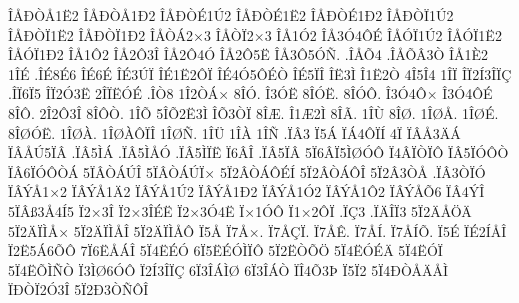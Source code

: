 {^^ce^^c5^^d0^^d2^^c51^^cb2
^^ce^^c5^^d0^^d2^^c51^^d02
^^ce^^c5^^d0^^d2^^c91^^da2
^^ce^^c5^^d0^^d2^^c91^^cb2
^^ce^^c5^^d0^^d2^^c91^^d02
^^ce^^c5^^d0^^d2^^cf1^^da2
^^ce^^c5^^d0^^d2^^cf1^^cb2
^^ce^^c5^^d0^^d2^^cf1^^d02
^^ce^^c5^^d2^^c12^^d73
^^ce^^c5^^d2^^cf2^^d73
^^ce^^c51^^d32
^^ce^^c53^^d34^^d4^^c9
^^ce^^c5^^d3^^cf1^^da2
^^ce^^c5^^d3^^cf1^^cb2
^^ce^^c5^^d3^^cf1^^d02
^^ce^^c51^^d42
^^ce^^c52^^d43^^ce
^^ce^^c52^^d44^^d3
^^ce^^c52^^d45^^cb
^^ce^^c53^^d45^^d3^^d1.
.^^ce^^c5^^d54
.^^ce^^c5^^d5^^c23^^d2
^^ce^^c51^^c82
1^^ce^^c9
.^^ce^^c98^^c96
^^ce^^c96^^c9
^^ce^^c93^^da^^cf
^^ce^^c91^^cb2^^d4^^cf
^^ce^^c94^^d35^^d4^^c9^^d2
^^ce^^c95^^cf^^ce
^^ce^^cb3^^cc
^^ce1^^cb2^^d2
4^^ce5^^ce4
1^^ce^^cf
^^ce^^cf2^^cd3^^ce^^cf^^c7
.^^ce^^cf6^^cf5
^^ce^^cf2^^d33^^cb
2^^ce^^cf^^cb^^d3^^c9
.^^ce^^d28
1^^ce2^^d2^^c1^^d7
8^^ce^^d3.
^^ce3^^d3^^cb
8^^ce^^d3^^cb.
8^^ce^^d3^^d4.
^^ce3^^d34^^d4^^d7
^^ce3^^d34^^d4^^c9
8^^ce^^d4.
2^^ce2^^d43^^ce
8^^ce^^d4^^d2.
1^^ce^^d5
5^^ce^^d52^^cb3^^cc
^^ce^^d53^^d2^^cf
8^^ce^^c6.
^^ce1^^c62^^cc
8^^ce^^c3.
1^^ce^^d9
8^^ce^^d8.
1^^ce^^d8^^c5.
1^^ce^^d8^^c9.
8^^ce^^d8^^d3^^cb.
1^^ce^^d8^^c0.
1^^ce^^d8^^c0^^d4^^cf^^ce
1^^ce^^d8^^d1.
1^^ce^^dc
1^^ce^^c0
1^^ce^^d1
.^^cf^^c23
^^cf5^^c1
^^cf^^c14^^d4^^cf^^cd
4^^cf
^^cf^^c2^^c53^^c4^^c1
^^cf^^c2^^c5^^da5^^cf^^c2
.^^cf^^c25^^cc^^c1
.^^cf^^c25^^cc^^c5^^d3
.^^cf^^c25^^cc^^cf^^cb
^^cf6^^c2^^ce
.^^cf^^c25^^cf^^c2
5^^cf6^^c2^^cf5^^cc^^d8^^d3^^d4
^^cf4^^c2^^cf^^d2^^cf^^d4
^^cf^^c25^^cf^^d3^^d4^^d2
^^cf^^c26^^cf^^d3^^d4^^d2^^c1
5^^cf^^c2^^d2^^c1^^da^^ce
5^^cf^^c2^^d2^^c1^^da^^cf^^d7
5^^cf2^^c2^^d2^^c1^^d4^^c9^^cd
5^^cf2^^c2^^d2^^c1^^d4^^ce
5^^cf2^^c23^^d2^^c5
.^^cf^^c23^^d2^^cf^^d3
^^cf^^c2^^dd^^c51^^d72
^^cf^^c2^^dd^^c51^^c42
^^cf^^c2^^dd^^c51^^da2
^^cf^^c2^^dd^^c51^^d02
^^cf^^c2^^dd^^c51^^d32
^^cf^^c2^^dd^^c51^^d42
^^cf^^c2^^dd^^c5^^d56
^^cf^^c24^^dd^^ce
5^^cf^^c2^^df3^^c54^^cd5
^^cf2^^d73^^ce
^^cf2^^d73^^ce^^c9^^cb
^^cf2^^d73^^d34^^cb
^^cf^^d71^^d3^^d4
^^cf1^^d72^^d4^^cf
.^^cf^^c73
.^^cf^^c4^^ce^^cf3
5^^cf2^^c4^^c5^^d6^^c4
5^^cf2^^c4^^cf^^cc^^c5^^d7
5^^cf2^^c4^^cf^^cc^^c5^^ce
5^^cf2^^c4^^cf^^cc^^c5^^d4
^^cf5^^c5
^^cf7^^c5^^d7.
^^cf7^^c5^^c7^^cf.
^^cf7^^c5^^ca.
^^cf7^^c5^^cd.
^^cf7^^c5^^cd^^d5.
^^cf5^^c9
^^cf^^c92^^cd^^c5^^ce
^^cf2^^cb5^^c16^^d5^^d4
7^^cf6^^cb^^c5^^c1^^ce
5^^cf4^^cb^^c9^^d3
6^^cf5^^cb^^c9^^d3^^cc^^cf^^d4
5^^cf2^^cb^^d2^^d5^^d6
5^^cf4^^cb^^d3^^c9^^c4
5^^cf4^^cb^^d3^^cf
5^^cf4^^cb^^d5^^cc^^d1^^d2
^^cf3^^cc^^d86^^d3^^d4
^^cf2^^cd3^^ce^^cf^^c7
6^^cf3^^ce^^c1^^cc^^d8
6^^cf3^^ce^^c1^^d2
^^cf^^ce4^^d53^^de
^^cf5^^cf2
5^^cf4^^d0^^d2^^c5^^c4^^c5^^cc
^^cf^^d0^^d2^^cf2^^d33^^ce
5^^cf2^^d03^^d2^^d1^^d4^^ce
}
